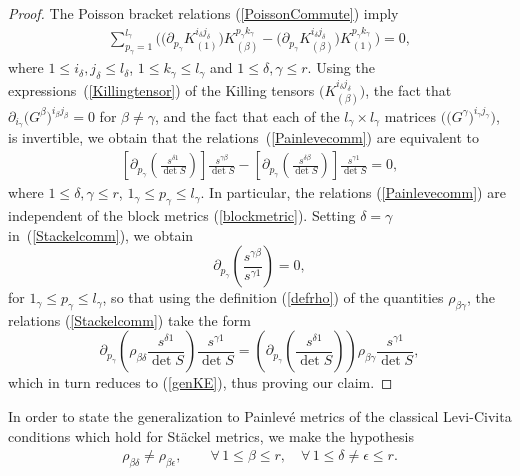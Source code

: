 \documentclass[pdftex]{sigma}
\numberwithin{equation}{section}
\newcommand{\jbeta}{j_{\beta}}
\newcommand{\kgamma}{k_{\gamma}}
\newcommand{\pgamma}{p_{\gamma}}
\newcommand{\igamma}{i_{\gamma}}
\newcommand{\jgamma}{j_{\gamma}}
\newcommand{\lgamma}{l_{\gamma}}
\newcommand{\idelta}{i_{\delta}}
\newcommand{\jdelta}{j_{\delta}}
\newcommand{\ldelta}{l_{\delta}}
\newcommand{\ibeta}{i_{\beta}}
\begin{document}
\begin{proof}The Poisson bracket relations (\ref{PoissonCommute}) imply
\begin{gather}\label{Painlevecomm}
\sum_{\pgamma=1}^{\lgamma}\big(\big(\partial_{\pgamma} K_{(1)}^{\idelta \jdelta}\big) K_{(\beta)}^{\pgamma \kgamma}-\big(\partial_{\pgamma} K_{(\beta)}^{\idelta \jdelta}\big) K_{(1)}^{\pgamma \kgamma}\big)=0,
\end{gather}
where $1\leq \idelta, \jdelta \leq \ldelta$, $1\leq \kgamma \leq \lgamma$ and $1\leq \delta, \gamma \leq r$. Using the expressions~(\ref{Killingtensor}) of the Killing tensors $\big(K_{(\beta)}^{\idelta \jdelta}\big)$, the fact that $\partial_{\igamma}\big(G^{\beta}\big)^{\ibeta \jbeta}=0$ for $\beta \neq \gamma$, and the fact that each of the $\lgamma \times \lgamma$ matrices $\big(\big(G^{\gamma}\big)^{\igamma \jgamma}\big)$, is invertible, we obtain that the relations~(\ref{Painlevecomm}) are equivalent to
\begin{gather}\label{Stackelcomm}
\left[\partial_{\pgamma}\left(\frac{s^{\delta 1}}{\det S}\right)\right] \frac{s^{\gamma \beta}}{\det S}-\left[\partial_{\pgamma}\left(\frac{s^{\delta \beta}}{\det S}\right)\right] \frac{s^{\gamma 1}}{\det S}=0,
\end{gather}
where $1\leq \delta, \gamma \leq r$, $1_{\gamma}\leq \pgamma \leq \lgamma $. In particular, the relations (\ref{Painlevecomm}) are independent of the block metrics (\ref{blockmetric}). Setting $\delta = \gamma$ in~(\ref{Stackelcomm}), we obtain
\[
\partial_{\pgamma}\left(\frac{s^{\gamma \beta}}{s^{\gamma 1}}\right)=0,
\]
for $1_{\gamma}\leq \pgamma \leq \lgamma$, so that using the definition (\ref{defrho}) of the quantities $\rho_{\beta \gamma}$, the relations (\ref{Stackelcomm}) take the form
\[
\partial_{\pgamma}\left(\rho_{ \beta \delta}\frac{s^{\delta 1}}{\det S}\right)\frac{s^{\gamma 1}}{\det S}=\left(\partial_{\pgamma}\left(\frac{s^{\delta 1}}{\det S}\right)\right)\rho_{\beta \gamma} \frac{s^{\gamma 1}}{\det S},
\]
which in turn reduces to (\ref{genKE}), thus proving our claim.
\end{proof}

In order to state the generalization to Painlev\'e metrics of the classical Levi-Civita conditions which hold for St\"ackel metrics, we make the hypothesis
\begin{gather}\label{H}
\rho_{\beta \delta}\neq \rho_{\beta \epsilon},\qquad \forall\, 1\leq \beta \leq r,\quad \forall\, 1\leq \delta\neq \epsilon \leq r.
\end{gather}
\end{document}
